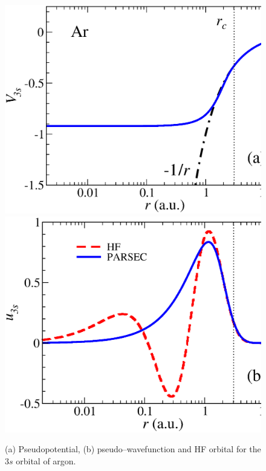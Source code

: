 \documentclass[10pt]{article}
\begin{document}
\begin{figure}[H]
\centering
 \includegraphics[height=0.23\textheight]{figures/pseudopot/pseudopotAr.eps}
\hspace{0.2cm}
 \includegraphics[height=0.23\textheight]{figures/pseudopot/pseudofuncAr.eps}
 \caption{(a) Pseudopotential, (b) pseudo--wavefunction and 
 HF orbital for the $3s$ orbital of argon.}
 \label{fig:pseudoLi}
\end{figure}
\end{document}
